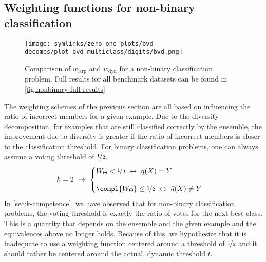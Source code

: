 \documentclass[../main.tex]{subfiles}
\begin{document}



\subsection{Weighting functions for non-binary classification}
\label{sec:nonbinary}

\begin{figure*}
    \texttt{[image: symlinks/zero-one-plots/bvd-decomps/plot\_bvd\_multiclass/digits/bvd.png]}
    \caption{
        Comparison of $w_\text{lerp}$ and $w_\text{dyn}$ for a non-binary classification problem. Full results for all benchmark datasets can be found in \cref{fig:nonbinary-full-results}
    }
    \label{fig:nonbinary-results}
\end{figure*}

The weighting schemes of the previous section are all based on influencing the ratio of incorrect members for a given example. Due to the diversity decomposition, for examples that are still classified correctly by the ensemble, the improvement due to diversity is greater if the ratio of incorrect members is closer to the classification threshold.
For binary classification problems, one can always assume a voting threshold of $\nicefrac{1}{2}$. 
\begin{align}
k = 2 ~\rightarrow~ 
\begin{cases}
W_{\Theta}  < \nicefrac{1}{2} ~\leftrightarrow~  \bar{q}(X) = Y \\[1em]
\compl{W_\Theta }  \leq \nicefrac{1}{2} ~\leftrightarrow~ \bar{q}(X) \not= Y
\end{cases}
\end{align}
In \cref{sec:k-competence}, we have observed that for non-binary classification problems, the voting threshold is exactly the ratio of votes for the next-best class. This is a quantity that depends on the ensemble and the given example and the equivalences above no longer holds. Because of this, we hypothesize that it is inadequate to use a weighting function centered around a threshold of $\nicefrac{1}{2}$ and it should rather be centered around the actual, dynamic threshold $t$.
\end{document}
